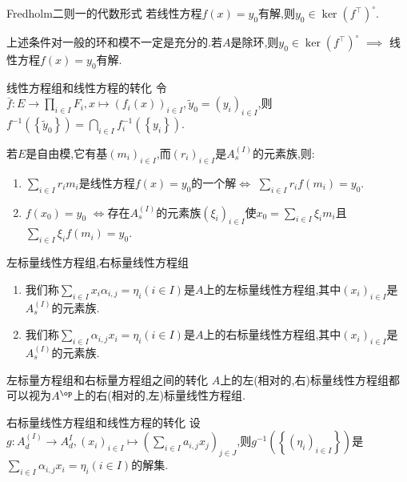 \begin{proposition}{Fredholm二则一的代数形式}{}
	若线性方程$f\left(x\right)=y_{0}$有解,则$y_{0}\in\ker\left(f^{\top}\right)^{\circ}$.
\end{proposition}

\begin{remark}{}{}
	上述条件对一般的环和模不一定是充分的.若$A$是除环,则$y_{0}\in\ker\left(f^{\top}\right)^{\circ}$ $\implies$ 线性方程$f\left(x\right)=y_{0}$有解.
\end{remark}

\begin{proposition}{线性方程组和线性方程的转化}{}
	令$\bar{f}:E\to\prod\limits_{i\in I}F_{i},x\mapsto\left(f_{i}\left(x\right)\right)_{i\in I},\tilde{y}_{0}=\left(y_{i}\right)_{i\in I}$,则$f^{-1}\left(\left\{\tilde{y}_{0}\right\}\right)=\bigcap\limits_{i\in I}f_{i}^{-1}\left(\left\{y_{i}\right\}\right)$.
\end{proposition}

\begin{remark}{}{}
	若$E$是自由模,它有基$\left(m_{i}\right)_{i\in I}$,而$\left(r_{i}\right)_{i\in I}$是$A_{s}^{\left(I\right)}$的元素族,则:
	\begin{enumerate}
		\item $\sum\limits_{i\in I}r_{i}m_{i}$是线性方程$f\left(x\right)=y_{0}$的一个解$\iff$ $\sum\limits_{i\in I}r_{i}f\left(m_{i}\right)=y_{0}$.
		\item $f\left(x_{0}\right)=y_{0}$ $\iff$存在$A_{s}^{\left(I\right)}$的元素族$\left(\xi_{i}\right)_{i\in I}$使$x_{0}=\sum\limits_{i\in I}\xi_{i}m_{i}$且$\sum\limits_{i\in I}\xi_{i}f\left(m_{i}\right)=y_{0}$.
	\end{enumerate}
\end{remark}

\begin{remark}{左标量线性方程组,右标量线性方程组}{}
	\begin{enumerate}
		\item 我们称$\sum\limits_{i\in I}x_{i}\alpha_{i,j}=\eta_{i}(i\in I)$是$A$上的左标量线性方程组,其中$\left(x_{i}\right)_{i\in I}$是$A_{s}^{\left(I\right)}$的元素族.
		\item 我们称$\sum\limits_{i\in I}\alpha_{i,j}x_{i}=\eta_{i}(i\in I)$是$A$上的右标量线性方程组,其中$\left(x_{i}\right)_{i\in I}$是$A_{s}^{\left(I\right)}$的元素族.
	\end{enumerate}
\end{remark}

\begin{remark}{左标量方程组和右标量方程组之间的转化}{}
	$A$上的左(相对的,右)标量线性方程组都可以视为$A^{\op}$上的右(相对的,左)标量线性方程组.
\end{remark}

\begin{proposition}{右标量线性方程组和线性方程的转化}{}
	设$g:A_{d}^{\left(I\right)}\to A_{d}^{I},\left(x_{i}\right)_{i\in I}\mapsto\left(\sum\limits_{i\in I}a_{i,j}x_{j}\right)_{j\in J}$,则$g^{-1}\left(\left\{\left(\eta_{i}\right)_{i\in I}\right\}\right)$是$\sum\limits_{i\in I}\alpha_{i,j}x_{i}=\eta_{i}(i\in I)$的解集.
\end{proposition}

